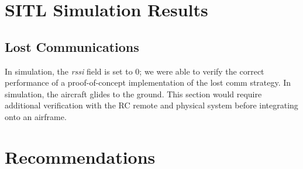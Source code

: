 \documentclass{aiaa}
\begin{document}
\section{SITL Simulation Results}
\subsection{Lost Communications}
In simulation, the \textit{rssi} field is set to 0; we were able to verify the correct performance of a proof-of-concept implementation of the lost comm strategy. In simulation, the aircraft glides to the ground. This section would require additional verification with the RC remote and physical system before integrating onto an airframe.
\section{Recommendations}
\end{document}
